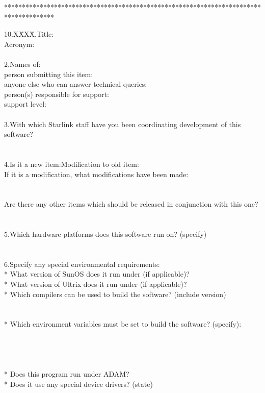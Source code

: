 **************************************************************************************
\begin{tabbing}
10.X\=XXX\=.\>Title:\\
\>Acronym:\\
\\
2.\>Names of:\\
\>\>person submitting this item:\\
\>\>anyone else who can answer technical queries:\\
\>\>person(s) responsible for support:\\
\>\>support level:\\
\\
3.\>With which Starlink staff have you been coordinating development of this
software?\\
\\
\\
4.\>Is it a new item:\hspace{30mm}Modification to old item:\\
\>If it is a modification, what modifications have been made:\\
\\
\\
\>Are there any other items which should be released in conjunction with this
one?\\
\\
\\
5.\>Which hardware platforms does this software run on? (specify)
\\
\\
\\
6.\>Specify any special environmental requirements:\\
\>* What version of SunOS does it run under (if applicable)?\\
\>* What version of Ultrix does it run under (if applicable)?\\
\>* Which compilers can be used to build the software? (include version)\\
\\
\\
\>* Which environment variables must be set to build the software? (specify):\\
\\
\\
\\
\\
\>* Does this program run under ADAM?\\
\>* Does it use any special device drivers? (state)\\

\end{tabbing}
